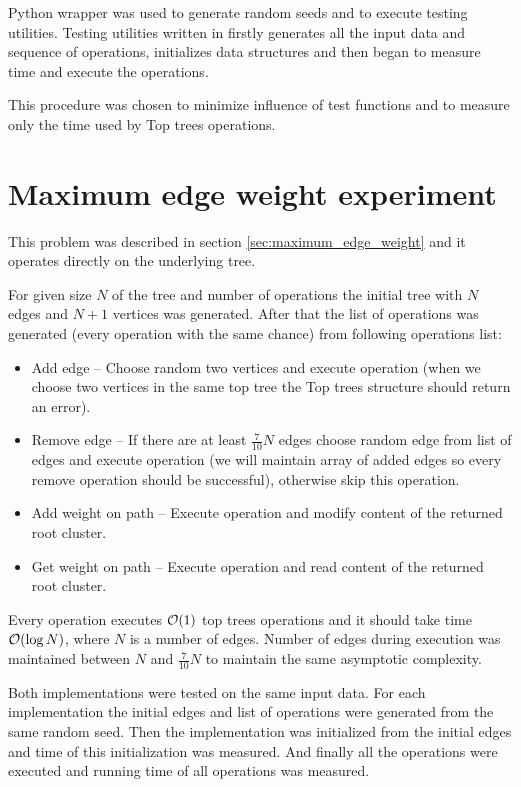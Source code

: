 Python wrapper was used to generate random seeds and to execute testing utilities.
Testing utilities written in \Cpp{} firstly generates all the input data and
sequence of operations, initializes data structures and then began to measure
time and execute the operations.

This procedure was chosen to minimize influence of test functions and to measure
only the time used by Top trees operations.

\vfill\eject %

\section{Maximum edge weight experiment}
\label{sec:experiment_maximum_edge_weight}

This problem was described in section \ref{sec:maximum_edge_weight} and it
operates directly on the underlying tree.

For given size $N$ of the tree and number of operations the initial tree with
$N$ edges and $N+1$ vertices was generated. After that the list of operations
was generated (every operation with the same chance) from following operations
list:

\begin{itemize}
\item Add edge -- Choose random two vertices and execute \Link{} operation
(when we choose two vertices in the same top tree the Top trees structure should
return an error).
\item Remove edge -- If there are at least $\frac{7}{10}N$ edges choose random
edge from list of edges and execute \Cut{} operation (we will maintain array of
added edges so every remove operation should be successful), otherwise skip this
operation.
\item Add weight on path -- Execute \Expose{} operation and modify content of
the returned root cluster.
\item Get weight on path -- Execute \Expose{} operation and read content of the
returned root cluster.
\end{itemize}

Every operation executes ${\cal O}(1)$ top trees operations and it should take time
${\cal O}(\log N)$, where $N$ is a number of edges. Number of edges during execution
was maintained between $N$ and $\frac{7}{10}N$ to maintain the same asymptotic
complexity.

Both implementations were tested on the same input data. For each implementation
the initial edges and list of operations were generated from the same random
seed. Then the implementation was initialized from the initial edges and time of
this initialization was measured. And finally all the operations were executed
and running time of all operations was measured.

